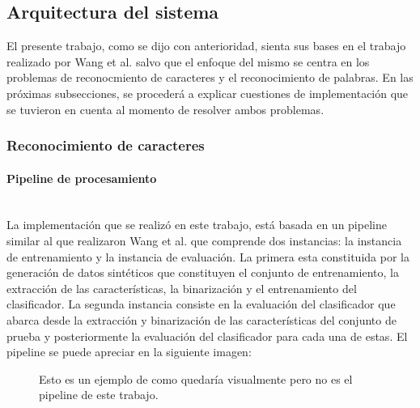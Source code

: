 \subsection{Arquitectura del sistema}
\label{subsection:impl_propia}

	El presente trabajo, como se dijo con anterioridad, sienta sus bases en el trabajo realizado por Wang et al. salvo que el enfoque del mismo se centra en los problemas de reconocmiento de caracteres y el reconocimiento de palabras. En las próximas subsecciones, se procederá a explicar cuestiones de implementación que se tuvieron en cuenta al momento de resolver ambos problemas.

	\subsubsection{Reconocimiento de caracteres}
	\label{subsubsection:recon-caracteres}
		\paragraph{Pipeline de procesamiento} ~\\

			La implementación que se realizó en este trabajo, está basada en un pipeline similar al que realizaron Wang et al. que comprende dos instancias: la instancia de entrenamiento y la instancia de evaluación. La primera esta constituida por la generación de datos sintéticos que constituyen el conjunto de entrenamiento, la extracción de las características, la binarización y el entrenamiento del clasificador. La segunda instancia consiste en la evaluación del clasificador que abarca desde la extracción y binarización de las características del conjunto de prueba y posteriormente la evaluación del clasificador para cada una de estas. El pipeline se puede apreciar en la siguiente imagen:

			\begin{figure}[htbp]
				\centering
				\caption[Pipeline de procesamiento]{Esto es un ejemplo de como quedaría visualmente pero no es el pipeline de este trabajo.}
				\label{fig: Pipeline de mi sistema}
			\end{figure}

